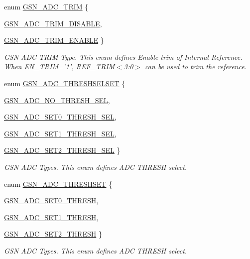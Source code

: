 \begin{DoxyCompactItemize}
enum \hyperlink{a00643_gae2b441d4a96a542d5d290e1454fbaa1d}{GSN\_\-ADC\_\-TRIM} \{ \par
\hyperlink{a00643_ggae2b441d4a96a542d5d290e1454fbaa1da3a85d4591047f6621e3d6299a52424f8}{GSN\_\-ADC\_\-TRIM\_\-DISABLE}, 
\par
\hyperlink{a00643_ggae2b441d4a96a542d5d290e1454fbaa1da4120ed751791cc81cc336e056a238a77}{GSN\_\-ADC\_\-TRIM\_\-ENABLE}
 \}
\begin{DoxyCompactList}\small\item\em GSN ADC TRIM Type. This enum defines Enable trim of Internal Reference. When EN\_\-TRIM='1', REF\_\-TRIM$<$3:0$>$ can be used to trim the reference. \end{DoxyCompactList}\item 
enum \hyperlink{a00643_ga1ce87a8054fcb9ddfc65af6e2ceae738}{GSN\_\-ADC\_\-THRESHSELSET} \{ \par
\hyperlink{a00643_gga1ce87a8054fcb9ddfc65af6e2ceae738af35f8db45787b131df842e6fb9abccba}{GSN\_\-ADC\_\-NO\_\-THRESH\_\-SEL}, 
\par
\hyperlink{a00643_gga1ce87a8054fcb9ddfc65af6e2ceae738ae1e1c872747c0a609a58f6b4b2eefaa2}{GSN\_\-ADC\_\-SET0\_\-THRESH\_\-SEL}, 
\par
\hyperlink{a00643_gga1ce87a8054fcb9ddfc65af6e2ceae738aabc7778dd334edf63537e39b93c90530}{GSN\_\-ADC\_\-SET1\_\-THRESH\_\-SEL}, 
\par
\hyperlink{a00643_gga1ce87a8054fcb9ddfc65af6e2ceae738a3c928a7ab37c22ab75687e22b251e77c}{GSN\_\-ADC\_\-SET2\_\-THRESH\_\-SEL}
 \}
\begin{DoxyCompactList}\small\item\em GSN ADC Types. This enum defines ADC THRESH select. \end{DoxyCompactList}\item 
enum \hyperlink{a00643_ga412edebebb3303e32a1c0c0bcab46d04}{GSN\_\-ADC\_\-THRESHSET} \{ \par
\hyperlink{a00643_gga412edebebb3303e32a1c0c0bcab46d04a3cdc08dc4139f4f9310caeb3d6881a38}{GSN\_\-ADC\_\-SET0\_\-THRESH}, 
\par
\hyperlink{a00643_gga412edebebb3303e32a1c0c0bcab46d04a44567e2eee607e94b007a7fe60674690}{GSN\_\-ADC\_\-SET1\_\-THRESH}, 
\par
\hyperlink{a00643_gga412edebebb3303e32a1c0c0bcab46d04acc8e285524bd52bae7583dac070985b2}{GSN\_\-ADC\_\-SET2\_\-THRESH}
 \}
\begin{DoxyCompactList}\small\item\em GSN ADC Types. This enum defines ADC THRESH select. \end{DoxyCompactList}\item 

\end{DoxyCompactItemize}
